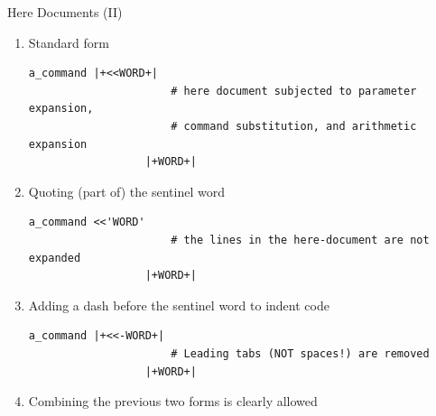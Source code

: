 \begin{frame}[fragile]{Here Documents (II)}
    \vspace{-1mm}
    \begin{enumerate}
        \item Standard form
              \begin{lstlisting}[style=MyBash, numbers=none, aboveskip=2mm, belowskip=-5mm]
                  a_command |+<<WORD+|
                      # here document subjected to parameter expansion,
                      # command substitution, and arithmetic expansion
                  |+WORD+|
              \end{lstlisting}
        \item Quoting (part of) the sentinel word
              \begin{lstlisting}[style=MyBash, numbers=none, aboveskip=2mm, belowskip=-5mm]
                  a_command <<'WORD'
                      # the lines in the here-document are not expanded
                  |+WORD+|
              \end{lstlisting}
        \item Adding a dash before the sentinel word to indent code
              \begin{lstlisting}[style=MyBash, numbers=none, aboveskip=2mm, belowskip=-5mm]
                  a_command |+<<-WORD+|
                      # Leading tabs (NOT spaces!) are removed
                  |+WORD+|
              \end{lstlisting}
        \item Combining the previous two forms is clearly allowed
    \end{enumerate}
\end{frame}
